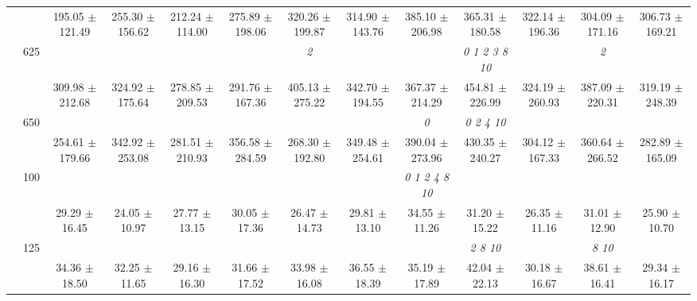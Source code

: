 \begin{table}[h]
{\begin{tabular}{
        ccccccccccccc}
 & & 195.05 $\pm$ 121.49& 255.30 $\pm$ 156.62& 212.24 $\pm$ 114.00& 275.89 $\pm$ 198.06& 320.26 $\pm$ 199.87& 314.90 $\pm$ 143.76& 385.10 $\pm$ 206.98& 365.31 $\pm$ 180.58& 322.14 $\pm$ 196.36& 304.09 $\pm$ 171.16& 306.73 $\pm$ 169.21 \\ 
 & \multirow{2}{*}{625}& \cellcolor[HTML]{EFEFEF} & \cellcolor[HTML]{EFEFEF} & \cellcolor[HTML]{EFEFEF} & \cellcolor[HTML]{EFEFEF} & \cellcolor[HTML]{EFEFEF} \textit{ 2 }& \cellcolor[HTML]{EFEFEF} & \cellcolor[HTML]{EFEFEF} & \cellcolor[HTML]{EFEFEF} \textit{  0  1  2  3  8 10 }& \cellcolor[HTML]{EFEFEF} & \cellcolor[HTML]{EFEFEF} \textit{ 2 }& \cellcolor[HTML]{EFEFEF}  \\ 
 & & \cellcolor[HTML]{EFEFEF} 309.98 $\pm$ 212.68& \cellcolor[HTML]{EFEFEF} 324.92 $\pm$ 175.64& \cellcolor[HTML]{EFEFEF} 278.85 $\pm$ 209.53& \cellcolor[HTML]{EFEFEF} 291.76 $\pm$ 167.36& \cellcolor[HTML]{EFEFEF} 405.13 $\pm$ 275.22& \cellcolor[HTML]{EFEFEF} 342.70 $\pm$ 194.55& \cellcolor[HTML]{EFEFEF} 367.37 $\pm$ 214.29& \cellcolor[HTML]{EFEFEF} 454.81 $\pm$ 226.99& \cellcolor[HTML]{EFEFEF} 324.19 $\pm$ 260.93& \cellcolor[HTML]{EFEFEF} 387.09 $\pm$ 220.31& \cellcolor[HTML]{EFEFEF} 319.19 $\pm$ 248.39 \\ 
 & \multirow{2}{*}{650}& & & & & & & \textit{ 0 }& \textit{  0  2  4 10 }& & &  \\ 
 & & 254.61 $\pm$ 179.66& 342.92 $\pm$ 253.08& 281.51 $\pm$ 210.93& 356.58 $\pm$ 284.59& 268.30 $\pm$ 192.80& 349.48 $\pm$ 254.61& 390.04 $\pm$ 273.96& 430.35 $\pm$ 240.27& 304.12 $\pm$ 167.33& 360.64 $\pm$ 266.52& 282.89 $\pm$ 165.09 \\ \midrule 
 & \multirow{2}{*}{100}& & & & & & & \textit{  0  1  2  4  8 10 }& & & &  \\ 
 & & 29.29 $\pm$ 16.45& 24.05 $\pm$ 10.97& 27.77 $\pm$ 13.15& 30.05 $\pm$ 17.36& 26.47 $\pm$ 14.73& 29.81 $\pm$ 13.10& 34.55 $\pm$ 11.26& 31.20 $\pm$ 15.22& 26.35 $\pm$ 11.16& 31.01 $\pm$ 12.90& 25.90 $\pm$ 10.70 \\ 
 & \multirow{2}{*}{125}& \cellcolor[HTML]{EFEFEF} & \cellcolor[HTML]{EFEFEF} & \cellcolor[HTML]{EFEFEF} & \cellcolor[HTML]{EFEFEF} & \cellcolor[HTML]{EFEFEF} & \cellcolor[HTML]{EFEFEF} & \cellcolor[HTML]{EFEFEF} & \cellcolor[HTML]{EFEFEF} \textit{  2  8 10 }& \cellcolor[HTML]{EFEFEF} & \cellcolor[HTML]{EFEFEF} \textit{  8 10 }& \cellcolor[HTML]{EFEFEF}  \\ 
 & & \cellcolor[HTML]{EFEFEF} 34.36 $\pm$ 18.50& \cellcolor[HTML]{EFEFEF} 32.25 $\pm$ 11.65& \cellcolor[HTML]{EFEFEF} 29.16 $\pm$ 16.30& \cellcolor[HTML]{EFEFEF} 31.66 $\pm$ 17.52& \cellcolor[HTML]{EFEFEF} 33.98 $\pm$ 16.08& \cellcolor[HTML]{EFEFEF} 36.55 $\pm$ 18.39& \cellcolor[HTML]{EFEFEF} 35.19 $\pm$ 17.89& \cellcolor[HTML]{EFEFEF} 42.04 $\pm$ 22.13& \cellcolor[HTML]{EFEFEF} 30.18 $\pm$ 16.67& \cellcolor[HTML]{EFEFEF} 38.61 $\pm$ 16.41& \cellcolor[HTML]{EFEFEF} 29.34 $\pm$ 16.17 \\ 

\end{tabular}}
\end{table}
